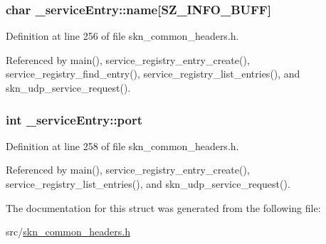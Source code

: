\subsubsection[{name}]{\setlength{\rightskip}{0pt plus 5cm}char \+\_\+service\+Entry\+::name\mbox{[}{\bf S\+Z\+\_\+\+I\+N\+F\+O\+\_\+\+B\+U\+F\+F}\mbox{]}}\label{struct__service_entry_aa66dcf0806f67276d049ac75c6153768}


Definition at line 256 of file skn\+\_\+common\+\_\+headers.\+h.



Referenced by main(), service\+\_\+registry\+\_\+entry\+\_\+create(), service\+\_\+registry\+\_\+find\+\_\+entry(), service\+\_\+registry\+\_\+list\+\_\+entries(), and skn\+\_\+udp\+\_\+service\+\_\+request().

\hypertarget{struct__service_entry_ac8a3a40de5eee937afb42faea4d18bb2}{}
\subsubsection[{port}]{\setlength{\rightskip}{0pt plus 5cm}int \+\_\+service\+Entry\+::port}\label{struct__service_entry_ac8a3a40de5eee937afb42faea4d18bb2}


Definition at line 258 of file skn\+\_\+common\+\_\+headers.\+h.



Referenced by main(), service\+\_\+registry\+\_\+entry\+\_\+create(), service\+\_\+registry\+\_\+list\+\_\+entries(), and skn\+\_\+udp\+\_\+service\+\_\+request().



The documentation for this struct was generated from the following file\+:\begin{DoxyCompactItemize}
\item 
src/\hyperlink{skn__common__headers_8h}{skn\+\_\+common\+\_\+headers.\+h}\end{DoxyCompactItemize}
